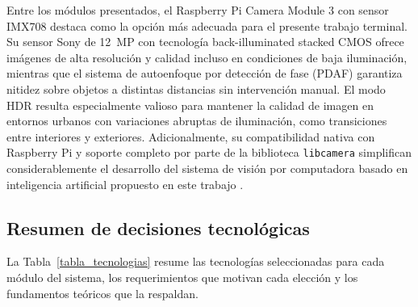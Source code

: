 Entre los módulos presentados, el Raspberry Pi Camera Module 3 con sensor IMX708 \cite{raspberrypi_camera_doc3} destaca como la opción más adecuada para el presente trabajo terminal. Su sensor Sony de 12~MP con tecnología back-illuminated stacked CMOS ofrece imágenes de alta resolución y calidad incluso en condiciones de baja iluminación, mientras que el sistema de autoenfoque por detección de fase (PDAF) garantiza nitidez sobre objetos a distintas distancias sin intervención manual. El modo HDR resulta especialmente valioso para mantener la calidad de imagen en entornos urbanos con variaciones abruptas de iluminación, como transiciones entre interiores y exteriores. Adicionalmente, su compatibilidad nativa con Raspberry Pi y soporte completo por parte de la biblioteca \texttt{libcamera} simplifican considerablemente el desarrollo del sistema de visión por computadora basado en inteligencia artificial propuesto en este trabajo \cite{raspberrypi_camera_doc3}.

\subsection{Resumen de decisiones tecnológicas}

La Tabla~\ref{tabla_tecnologias} resume las tecnologías seleccionadas para cada módulo
del sistema, los requerimientos que motivan cada elección y los fundamentos teóricos
que la respaldan.


